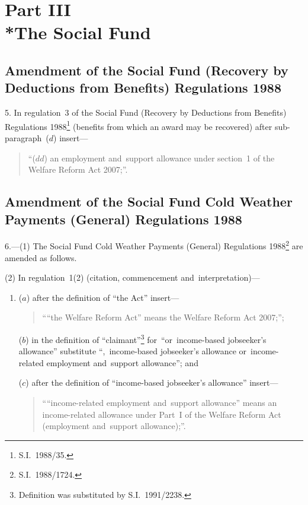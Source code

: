 \documentclass[12pt,a4paper]{article}
\begin{document}
\section[Part III --- The Social Fund]{Part III\\*The Social Fund}

\renewcommand\parthead{--- Part III}

\subsection[5. Amendment of the Social Fund (Recovery by Deductions from Benefits) Regulations 1988]{Amendment of the Social Fund (Recovery by Deductions from Benefits) Regulations 1988}

5.  In regulation~3 of the Social Fund (Recovery by Deductions from Benefits) Regulations 1988\footnote{S.I.~1988/35.} (benefits from which an award may be recovered) after sub-paragraph~($d$)  insert—
\begin{quotation}
“($dd$) an employment and~support allowance under section~1 of the Welfare Reform Act 2007;”.
\end{quotation}

\subsection[6. Amendment of the Social Fund Cold Weather Payments (General) Regulations 1988]{Amendment of the Social Fund Cold Weather Payments (General) Regulations 1988}

6.---(1)  The Social Fund Cold Weather Payments (General) Regulations 1988\footnote{S.I.~1988/1724.} are amended as follows.

(2) In regulation~1(2) (citation, commencement and~interpretation)—
\begin{enumerate}\item[]
($a$) after the definition of “the Act” insert—
\begin{quotation}
““the Welfare Reform Act” means the Welfare Reform Act 2007;”;
\end{quotation}

($b$) in the definition of “claimant”\footnote{Definition was substituted by S.I.~1991/2238.} for~“or~income-based jobseeker’s allowance” substitute “,~income-based jobseeker’s allowance or~income-related employment and~support allowance”; and

($c$) after the definition of “income-based jobseeker’s allowance” insert—
\begin{quotation}\sloppy
““income-related employment and~support allowance” means an income-related allowance under Part~I of the Welfare Reform Act (employment and~support allowance);”.
\end{quotation}
\end{enumerate}
\end{document}
